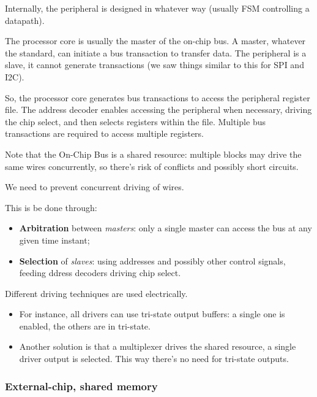 \documentclass[a4paper,11pt]{article}
\begin{document}
Internally, the peripheral is designed in whatever way (usually FSM controlling a datapath).

\par\smallskip

The processor core is usually the master of the on-chip bus.
A master, whatever the standard, can initiate a bus transaction to transfer data.
The peripheral is a slave, it cannot generate transactions (we saw things similar to this for SPI and I2C).

So, the processor core generates bus transactions to access the peripheral register file.
The address decoder enables accessing the peripheral when necessary, driving the chip select, and then selects registers within the file.
Multiple bus transactions are required to access multiple registers.

\par\smallskip

Note that the On-Chip Bus is a shared resource: multiple blocks may drive the same wires concurrently, so there's risk of conflicts and possibly short circuits.

We need to prevent concurrent driving of wires.

This is be done through:
\begin{itemize}
	\item \textbf{Arbitration} between \textit{masters}: only a single master can access the bus at any given time instant;
	\item \textbf{Selection} of \textit{slaves}: using addresses and possibly other control signals, feeding ddress decoders driving chip select.

\end{itemize}

Different driving techniques are used electrically. 
\begin{itemize}
	\item For instance, all drivers can use tri-state output buffers: a single one is enabled, the others are in tri-state.

	\item Another solution is that a multiplexer drives the shared resource, a single driver output is selected. This way there's no need for tri-state outputs.
\end{itemize}

\subsubsection{External-chip, shared memory}
\end{document}
